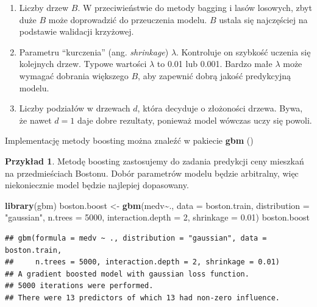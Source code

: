 \documentclass[
]{book}
\newenvironment{Shaded}{\begin{snugshade}}{\end{snugshade}}
\newcommand{\AttributeTok}[1]{\textcolor[rgb]{0.13,0.29,0.53}{#1}}
\newcommand{\DecValTok}[1]{\textcolor[rgb]{0.00,0.00,0.81}{#1}}
\newcommand{\FloatTok}[1]{\textcolor[rgb]{0.00,0.00,0.81}{#1}}
\newcommand{\FunctionTok}[1]{\textcolor[rgb]{0.13,0.29,0.53}{\textbf{#1}}}
\newcommand{\NormalTok}[1]{#1}
\newcommand{\OtherTok}[1]{\textcolor[rgb]{0.56,0.35,0.01}{#1}}
\newcommand{\SpecialCharTok}[1]{\textcolor[rgb]{0.81,0.36,0.00}{\textbf{#1}}}
\newcommand{\StringTok}[1]{\textcolor[rgb]{0.31,0.60,0.02}{#1}}
\providecommand{\tightlist}{%
  \setlength{\itemsep}{0pt}\setlength{\parskip}{0pt}}
\theoremstyle{plain}
\theoremstyle{definition}
\theoremstyle{definition}
\theoremstyle{definition}
\newtheorem{example}{Przykład}[chapter]
\theoremstyle{definition}
\theoremstyle{definition}
\theoremstyle{remark}
\begin{document}
\begin{enumerate}
\def\labelenumi{\arabic{enumi}.}
\tightlist
\item
  Liczby drzew \(B\). W przeciwieństwie do metody bagging i lasów losowych, zbyt duże \(B\) może doprowadzić do przeuczenia modelu. \(B\) ustala się najczęściej na podstawie walidacji krzyżowej.
\item
  Parametru ``kurczenia'' (ang. \emph{shrinkage}) \(\lambda\). Kontroluje on szybkość uczenia się kolejnych drzew. Typowe wartości \(\lambda\) to 0.01 lub 0.001. Bardzo małe \(\lambda\) może wymagać dobrania większego \(B\), aby zapewnić dobrą jakość predykcyjną modelu.
\item
  Liczby podziałów w drzewach \(d\), która decyduje o złożoności drzewa. Bywa, że nawet \(d=1\) daje dobre rezultaty, ponieważ model wówczas uczy się powoli.
\end{enumerate}

Implementację metody boosting można znaleźć w pakiecie \textbf{gbm} ()

\begin{example}
\protect\hypertarget{exm:przyk53}{}\label{exm:przyk53}Metodę boosting zastosujemy do zadania predykcji ceny mieszkań na przedmieściach Bostonu. Dobór parametrów modelu będzie arbitralny, więc niekoniecznie model będzie najlepiej dopasowany.
\end{example}

\begin{Shaded}
\begin{Highlighting}[]
\FunctionTok{library}\NormalTok{(gbm)}
\NormalTok{boston.boost }\OtherTok{\textless{}{-}} \FunctionTok{gbm}\NormalTok{(medv}\SpecialCharTok{\textasciitilde{}}\NormalTok{., }\AttributeTok{data =}\NormalTok{ boston.train,}
                    \AttributeTok{distribution =} \StringTok{"gaussian"}\NormalTok{, }
                    \AttributeTok{n.trees =} \DecValTok{5000}\NormalTok{,}
                    \AttributeTok{interaction.depth =} \DecValTok{2}\NormalTok{,}
                    \AttributeTok{shrinkage =} \FloatTok{0.01}\NormalTok{)}
\NormalTok{boston.boost}
\end{Highlighting}
\end{Shaded}

\begin{verbatim}
## gbm(formula = medv ~ ., distribution = "gaussian", data = boston.train, 
##     n.trees = 5000, interaction.depth = 2, shrinkage = 0.01)
## A gradient boosted model with gaussian loss function.
## 5000 iterations were performed.
## There were 13 predictors of which 13 had non-zero influence.
\end{verbatim}
\end{document}
